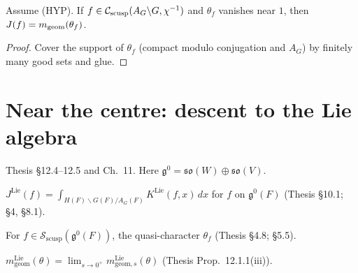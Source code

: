 \begin{proposition}
\label{geomAt_away}
\leanok
{}
Assume (HYP). If $f\in\mathcal{C}_{\mathrm{scusp}}(A_G\backslash G,\chi^{-1})$ and $\theta_f$ vanishes near $1$, then $J(f)=m_{\mathrm{geom}}(\theta_f)$.
\end{proposition}
\begin{proof}
\leanok
{}
Cover the support of $\theta_f$ (compact modulo conjugation and $A_G$) by finitely many good sets and glue.
\end{proof}

\section{Near the centre: descent to the Lie algebra}
Thesis \S12.4--12.5 and Ch.~11. Here $\mathfrak g^0=\mathfrak{so}(W)\oplus\mathfrak{so}(V)$.

\begin{definition}
\label{distribJLie}
\leanok
{}
$J^{\mathrm{Lie}}(f)=\int_{H(F)\backslash G(F)/A_G(F)}K^{\mathrm{Lie}}(f,x)\,dx$ for $f$ on $\mathfrak g^0(F)$
(Thesis \S10.1; \cite{Luo} \S4, \cite{BP} \S8.1).
\end{definition}

\begin{definition}
\label{thetaFLie}
\leanok
{}
For $f\in\mathcal S_{\mathrm{scusp}}(\mathfrak g^0(F))$, the quasi-character $\theta_f$ (Thesis \S4.8; \cite{BP} \S5.5).
\end{definition}

\begin{definition}
\label{mGeomLie}
\leanok
{}
$m^{\mathrm{Lie}}_{\mathrm{geom}}(\theta)=\lim_{s\to0^+}m^{\mathrm{Lie}}_{\mathrm{geom},s}(\theta)$ (Thesis Prop.~12.1.1(iii)).
\end{definition}


